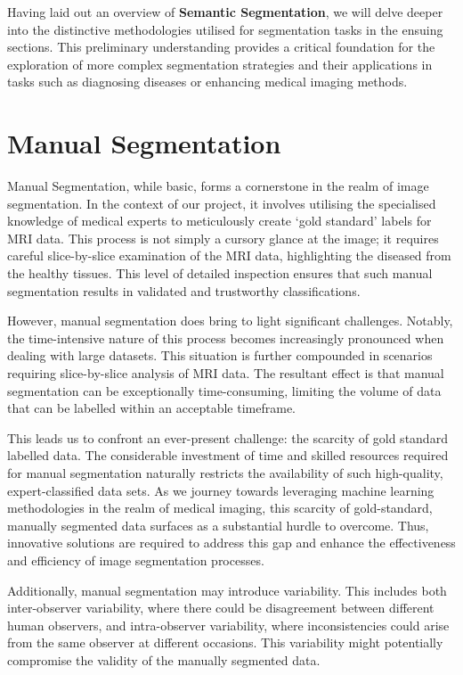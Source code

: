 Having laid out an overview of \textbf{Semantic Segmentation}, we will delve deeper into the distinctive methodologies utilised for segmentation tasks in the ensuing sections. This preliminary understanding provides a critical foundation for the exploration of more complex segmentation strategies and their applications in tasks such as diagnosing diseases or enhancing medical imaging methods.

\section{Manual Segmentation}
\label{sec:manual-segmentation}

Manual Segmentation, while basic, forms a cornerstone in the realm of image segmentation. In the context of our project, it involves utilising the specialised knowledge of medical experts to meticulously create `gold standard' labels for MRI data. This process is not simply a cursory glance at the image; it requires careful slice-by-slice examination of the MRI data, highlighting the diseased from the healthy tissues. This level of detailed inspection ensures that such manual segmentation results in validated and trustworthy classifications.

However, manual segmentation does bring to light significant challenges. Notably, the time-intensive nature of this process becomes increasingly pronounced when dealing with large datasets. This situation is further compounded in scenarios requiring slice-by-slice analysis of MRI data. The resultant effect is that manual segmentation can be exceptionally time-consuming, limiting the volume of data that can be labelled within an acceptable timeframe.

This leads us to confront an ever-present challenge: the scarcity of gold standard labelled data. The considerable investment of time and skilled resources required for manual segmentation naturally restricts the availability of such high-quality, expert-classified data sets. As we journey towards leveraging machine learning methodologies in the realm of medical imaging, this scarcity of gold-standard, manually segmented data surfaces as a substantial hurdle to overcome. Thus, innovative solutions are required to address this gap and enhance the effectiveness and efficiency of image segmentation processes.

Additionally, manual segmentation may introduce variability. This includes both inter-observer variability, where there could be disagreement between different human observers, and intra-observer variability, where inconsistencies could arise from the same observer at different occasions. This variability might potentially compromise the validity of the manually segmented data.

